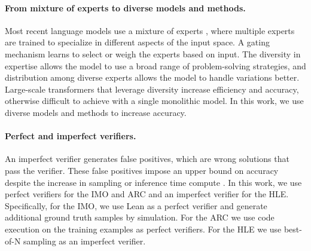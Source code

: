\paragraph{From mixture of experts to diverse models and methods.}
Most recent language models use a mixture of experts \cite{jiang2024mixtral}, where multiple experts are trained to specialize in different aspects of the input space. A gating mechanism learns to select or weigh the experts based on input. The diversity in expertise allows the model to use a broad range of problem-solving strategies, and distribution among diverse experts allows the model to handle variations better. Large-scale transformers that leverage diversity \cite{lepikhin2020gshard,fedus2022switch} increase efficiency and accuracy, otherwise difficult to achieve with a single monolithic model. In this work, we use diverse models and methods to increase accuracy.

\paragraph{Perfect and imperfect verifiers.}
An imperfect verifier generates false positives, which are wrong solutions that pass the verifier. These false positives impose an upper bound on accuracy despite the increase in sampling or inference time compute \cite{stroebl2024inference}. In this work, we use perfect verifiers for the IMO and ARC and an imperfect verifier for the HLE. Specifically, for the IMO, we use Lean as a perfect verifier and generate additional ground truth samples by simulation. For the ARC we use code execution on the training examples as perfect verifiers. For the HLE we use best-of-N sampling as an imperfect verifier.


